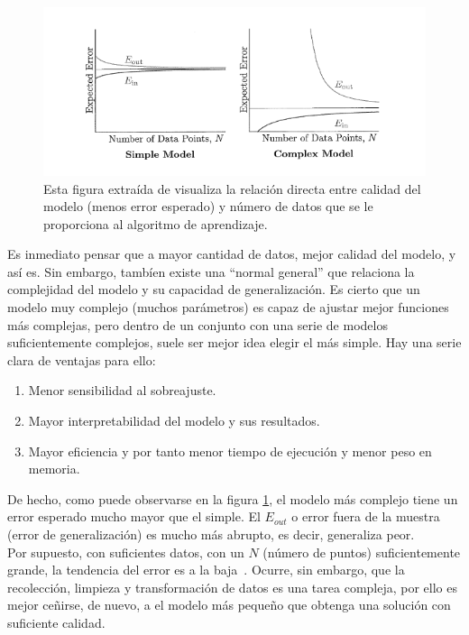 \begin{figure}[H]
    \begin{center}
        \includegraphics[width=1\textwidth]{imagenes/learning_from_data_vc.png}
    \end{center}
    \caption[Correlación entre error del modelo y N]{Esta figura extraída de \cite{Mostafa2012} visualiza la relación directa entre calidad del modelo (menos error esperado) y número de datos que se le proporciona al algoritmo de aprendizaje.}
    \label{fig:learning_from_data_vc}
\end{figure}

Es inmediato pensar que a mayor cantidad de datos, mejor calidad del modelo, y así es. Sin embargo, tambíen existe una ``normal general'' que relaciona la complejidad del modelo y su capacidad de generalización. Es cierto que un modelo muy complejo (muchos parámetros) es capaz de ajustar mejor funciones más complejas, pero dentro de un conjunto con una serie de modelos suficientemente complejos, suele ser mejor idea elegir el más simple. Hay una serie clara de ventajas para ello:
\begin{enumerate}
    \item Menor  sensibilidad al sobreajuste.
    \item Mayor interpretabilidad del modelo y sus resultados.
    \item Mayor eficiencia y por tanto menor tiempo de ejecución y menor peso en memoria.
\end{enumerate}

De hecho, como puede observarse en la figura \ref{fig:learning_from_data_vc}, el modelo más complejo tiene un error esperado mucho mayor que el simple. El $E_{out}$ o error fuera de la muestra (error de generalización) es mucho más abrupto, es decir, generaliza peor.\\[6pt]
Por supuesto, con suficientes datos, con un $N$ (número de puntos) suficientemente grande, la tendencia del error es a la baja~\cite{Mostafa2012, shalev2014understanding}. Ocurre, sin embargo, que la recolección, limpieza y transformación de datos es una tarea compleja, por ello es mejor ceñirse, de nuevo, a el modelo más pequeño que obtenga una solución con suficiente calidad.

